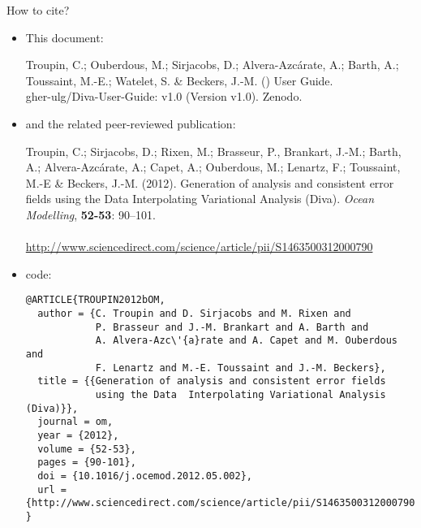 \newpage

\vspace*{\fill}

\begin{center}
\begin{minipage}[c]{.85\textwidth}
\Large{How to cite?}
\vspace{1cm}
\normalsize


\begin{itemize}
\item This document:


Troupin, C.; Ouberdous, M.; Sirjacobs, D.; Alvera-Azcárate, A.; Barth, A.; Toussaint, M.-E.; Watelet, S. \& Beckers, J.-M. (\the\year) \diva User Guide.\\
gher-ulg/Diva-User-Guide: v1.0 (Version v1.0). Zenodo. 


\item and the related peer-reviewed publication:


Troupin, C.; Sirjacobs, D.; Rixen, M.; Brasseur, P., Brankart, J.-M.; Barth,
A.; Alvera-Azc\'{a}rate, A.; Capet, A.; Ouberdous, M.; Lenartz, F.;
Toussaint, M.-E \& Beckers, J.-M. (2012).
Generation of analysis and consistent error fields using the Data
Interpolating Variational Analysis (Diva).
\emph{Ocean Modelling}, \textbf{52-53}: 90--101.\\
\\
\url{http://www.sciencedirect.com/science/article/pii/S1463500312000790}

\item[]

{\scriptsize
\BibTeX code:
\begin{verbatim}
@ARTICLE{TROUPIN2012bOM,
  author = {C. Troupin and D. Sirjacobs and M. Rixen and 
            P. Brasseur and J.-M. Brankart and A. Barth and 
            A. Alvera-Azc\'{a}rate and A. Capet and M. Ouberdous and 
            F. Lenartz and M.-E. Toussaint and J.-M. Beckers},
  title = {{Generation of analysis and consistent error fields 
            using the Data 	Interpolating Variational Analysis (Diva)}},
  journal = om,
  year = {2012},
  volume = {52-53},
  pages = {90-101},
  doi = {10.1016/j.ocemod.2012.05.002},
  url = {http://www.sciencedirect.com/science/article/pii/S1463500312000790}
}
\end{verbatim}
}

\end{itemize}


\vspace{.25cm}
\end{minipage}

\end{center}

\vspace*{\fill}

